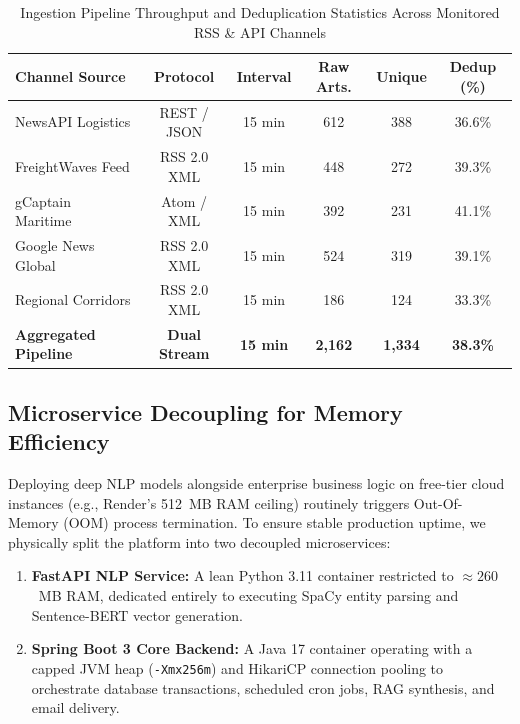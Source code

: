 \documentclass[conference]{IEEEtran}
\begin{document}
\begin{table}[t]
\caption{Ingestion Pipeline Throughput and Deduplication Statistics Across Monitored RSS \& API Channels}
\label{tab:ingestion_stats}
\centering
\setlength{\tabcolsep}{3.5pt}
\footnotesize
\begin{tabular}{lccccc}
\toprule
\textbf{Channel Source} & \textbf{Protocol} & \textbf{Interval} & \textbf{Raw Arts.} & \textbf{Unique} & \textbf{Dedup (\%)} \\
\midrule
NewsAPI Logistics & REST / JSON & 15 min & 612 & 388 & 36.6\% \\
FreightWaves Feed & RSS 2.0 XML & 15 min & 448 & 272 & 39.3\% \\
gCaptain Maritime & Atom / XML & 15 min & 392 & 231 & 41.1\% \\
Google News Global & RSS 2.0 XML & 15 min & 524 & 319 & 39.1\% \\
Regional Corridors & RSS 2.0 XML & 15 min & 186 & 124 & 33.3\% \\
\midrule
\textbf{Aggregated Pipeline} & \textbf{Dual Stream} & \textbf{15 min} & \textbf{2,162} & \textbf{1,334} & \textbf{38.3\%} \\
\bottomrule
\end{tabular}
\end{table}

\subsection{Microservice Decoupling for Memory Efficiency}
Deploying deep NLP models alongside enterprise business logic on free-tier cloud instances (e.g., Render's 512~MB RAM ceiling) routinely triggers Out-Of-Memory (OOM) process termination. To ensure stable production uptime, we physically split the platform into two decoupled microservices:
\begin{enumerate}[label=(\arabic*)]
    \item \textbf{FastAPI NLP Service:} A lean Python 3.11 container restricted to $\approx 260$~MB RAM, dedicated entirely to executing SpaCy entity parsing and Sentence-BERT vector generation.
    \item \textbf{Spring Boot 3 Core Backend:} A Java 17 container operating with a capped JVM heap (\texttt{-Xmx256m}) and HikariCP connection pooling to orchestrate database transactions, scheduled cron jobs, RAG synthesis, and email delivery.
\end{enumerate}

\end{document}
